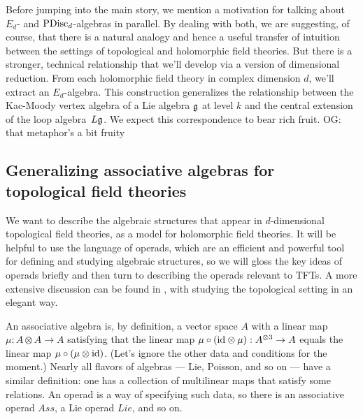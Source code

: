 \documentclass[11pt]{amsart}
\def\owen#1{{\textcolor{violet!65!black}{OG: {#1}}}}
\begin{document}
Before jumping into the main story, we mention a motivation for talking about $E_d$- and ${\rm PDisc}_d$-algebras in parallel.
By dealing with both, we are suggesting, of course, that there is a natural analogy and hence a useful transfer of intuition between the settings of topological and holomorphic field theories.
But there is a stronger, technical relationship that we'll develop via a version of dimensional reduction.
From each holomorphic field theory in complex dimension $d$, 
we'll extract an $E_d$-algebra.
This construction generalizes the relationship between the Kac-Moody vertex algebra of a Lie algebra $\mathfrak g$ at level $k$ and the central extension of the loop algebra~$L\mathfrak g$.
We expect this correspondence to bear rich fruit.
\owen{that metaphor's a bit fruity}

\subsection{Generalizing associative algebras for topological field theories}

We want to describe the algebraic structures that appear in $d$-dimensional topological field theories,
as a model for holomorphic field theories.
It will be helpful to use the language of operads, which are an efficient and powerful tool for defining and studying algebraic structures,
so we will gloss the key ideas of operads briefly and then turn to describing the operads relevant to TFTs.
A more extensive discussion can be found in \cite{CG1}, with \cite{ES} studying the topological setting in an elegant way.

An associative algebra is, by definition, a vector space $A$ with a linear map $\mu: A\otimes A \to A$ satisfying that the linear map $\mu \circ ({\rm id} \otimes \mu): A^{\otimes 3} \to A$ equals the linear map $\mu \circ (\mu \otimes {\rm id})$.
(Let's ignore the other data and conditions for the moment.)
Nearly all flavors of algebras --- Lie, Poisson, and so on --- have a similar definition:
one has a collection of multilinear maps that satisfy some relations.
An operad is a way of specifying such data, so there is an associative operad $Ass$,
a Lie operad $Lie$, and so on.
\end{document}
